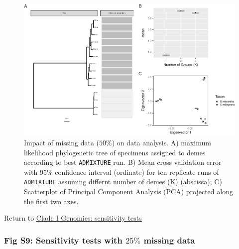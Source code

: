 \documentclass[
  11pt,
]{article}
\begin{document}
\begin{figure}
\includegraphics{Supplementary_Material_files/figure-latex/cladeIgenomicSensitivityAnalysesMiddleplots-1} \caption{Impact of missing data ($50\%$) on data analysis. A) maximum likelihood phylogenetic tree of specimens assigned to demes according to best \texttt{ADMIXTURE} run. B) Mean cross validation error with $95\%$ confidence interval (ordinate) for ten replicate runs of \texttt{ADMIXTURE} assuming differnt number of demes (K) (abscissa); C) Scatterplot of Principal Component Analysis (PCA) projected along the first two axes.}\label{fig:cladeIgenomicSensitivityAnalysesMiddleplots}
\end{figure}

Return to \protect\hyperlink{sensitivity-tests}{Clade I Genomics: sensitivity tests}
\pagebreak

\hypertarget{fig-s9-sensitivity-tests-with-25-missing-data}{%
\subsubsection{\texorpdfstring{Fig S9: Sensitivity tests with \(25\%\) missing data}{Fig S9: Sensitivity tests with 25\textbackslash\% missing data}}\label{fig-s9-sensitivity-tests-with-25-missing-data}}
\end{document}
